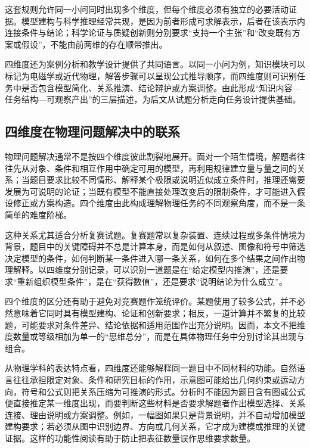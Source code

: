 \documentclass[
  12pt,
  a4paper,twoside,openany]{ctexbook}
\begin{document}
这套规则允许同一小问同时出现多个维度，但每个维度必须有独立的必要活动证据。模型建构与科学推理经常共现，是因为前者形成可求解表示，后者在该表示内连接条件与结论；科学论证与质疑创新则分别要求``支持一个主张''和``改变既有方案或假设''，不能由前两维的存在顺带推出。

四维度还为案例分析和教学设计提供了共同语言。以同一小问为例，知识模块可以标记为电磁学或近代物理，解答步骤可以呈现公式推导顺序，而四维度则可识别任务中是否包含模型简化、关系推演、结论辩护或方案调整。由此形成``知识内容---任务结构---可观察产出''的三层描述，为后文从试题分析走向任务设计提供基础。

\subsection{四维度在物理问题解决中的联系}\label{ux56dbux7ef4ux5ea6ux5728ux7269ux7406ux95eeux9898ux89e3ux51b3ux4e2dux7684ux8054ux7cfb}

物理问题解决通常不是按四个维度彼此割裂地展开。面对一个陌生情境，解题者往往先从对象、条件和相互作用中确定可用的模型，再利用规律建立量与量之间的关系；当题目要求比较不同情形、解释某个极限或说明近似成立条件时，推理还需要发展为可说明的论证；当既有模型不能直接处理改变后的限制条件，才可能进入假设修正或方案构造。四个维度由此构成理解物理任务的不同观察角度，而不是一条简单的难度阶梯。

这种关系尤其适合分析复赛试题。复赛题常以复杂装置、连续过程或多条件情境为背景，题目中的关键障碍并不总是计算本身，而是如何从叙述、图像和符号中筛选决定模型的条件，如何判断某一条件进入哪一条关系，如何在多个结果之间作出物理解释。以四维度分别记录，可以识别一道题是在``给定模型内推演''，还是要求``重新组织模型条件''，是在``获得数值''，还是要求``说明结论为什么成立''。

四个维度的区分还有助于避免对竞赛题作笼统评价。某题使用了较多公式，并不必然意味着它同时具有模型建构、论证和创新要求；相反，一道计算并不繁复的比较题，可能要求对条件差异、结论依据和适用范围作出充分说明。因而，本文不把维度数量或等级相加为单一的``思维总分''，而是在具体物理任务中分别讨论其出现与组合。

从物理学科的表达特点看，四维度还能够解释同一题目中不同材料的功能。自然语言往往承担限定对象、条件和研究目标的作用，示意图可能给出几何约束或运动方向，符号和公式则把关系压缩为可推演的形式。分析时不能因为题目含有图或公式便直接推定某一维度出现，而要判断这些材料是否要求解题者作出模型选择、关系连接、理由说明或方案调整。例如，一幅图如果只是背景说明，并不自动增加模型建构要求；若必须从图中识别边界、方向或几何关系，它才成为建模或推理的关键证据。这样的功能性阅读有助于防止把表征数量误作思维要求数量。
\end{document}
